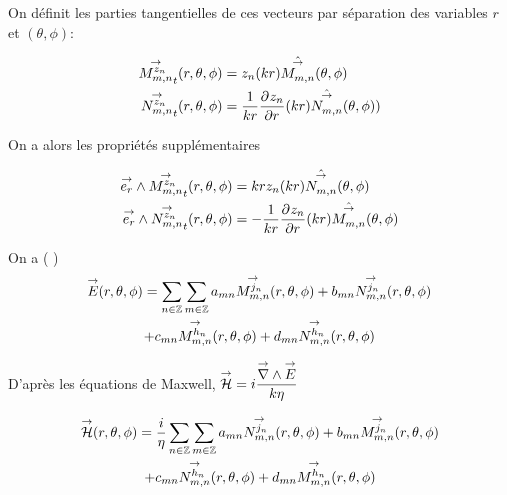 

        On définit les parties tangentielles de ces vecteurs par séparation des variables \(r\) et \((\theta,\phi)\):
     
        \begin{align}
          \Mmn[z_n]_t(\rtp) &= z_n(kr)\hat{\Mmn}(\tp)
          \\
          \Nmn[z_n]_t(\rtp) &= \frac{1}{kr}\ddr{r}{z_n}(kr)\hat{\Nmn}(\tp))
        \end{align}

        On a alors les propriétés supplémentaires

        \begin{align}
          \vect{e_r} \pvect \Mmn[z_n]_t(\rtp) &= krz_n(kr)\hat{\Nmn}(\tp)
          \\
          \vect{e_r} \pvect \Nmn[z_n]_t(\rtp) &= -\frac{1}{kr}\ddr{r}{z_n}(kr)\hat{\Mmn}(\tp)
        \end{align}


        On a ( \cite{cheng_spectral_1993})
        \begin{multline}
            \vE(\rtp) = \sum_{n\in\ZZ}\sum_{m\in\ZZ} a_{mn} \Mmn[j_n](\rtp) + b_{mn} \Nmn[j_n](\rtp)
            \\
            + c_{mn} \Mmn[h_n](\rtp) + d_{mn} \Nmn[h_n](\rtp)
        \end{multline}

        D'après les équations de Maxwell, \(\vH = i\frac{\vrot \vE}{k\eta}\)

        \begin{multline}
            \vH(\rtp) = \frac{i}{\eta}\sum_{n\in\ZZ}\sum_{m\in\ZZ} a_{mn} \Nmn[j_n](\rtp) + b_{mn} \Mmn[j_n](\rtp)
            \\
            + c_{mn} \Nmn[h_n](\rtp) + d_{mn} \Mmn[h_n](\rtp)
        \end{multline}

